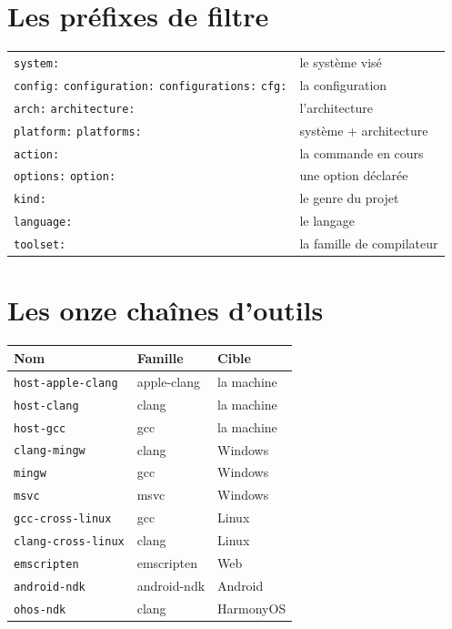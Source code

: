 \section{Les préfixes de filtre}

\begin{center}
\begin{tabular}{@{}ll@{}}
\toprule
\texttt{system:} & le système visé \\
\texttt{config:} \texttt{configuration:} \texttt{configurations:} \texttt{cfg:} & la configuration \\
\texttt{arch:} \texttt{architecture:} & l'architecture \\
\texttt{platform:} \texttt{platforms:} & système + architecture \\
\texttt{action:} & la commande en cours \\
\texttt{options:} \texttt{option:} & une option déclarée \\
\texttt{kind:} & le genre du projet \\
\texttt{language:} & le langage \\
\texttt{toolset:} & la famille de compilateur \\
\bottomrule
\end{tabular}
\end{center}

\section{Les onze chaînes d'outils}

\begin{center}
\begin{tabular}{@{}lll@{}}
\toprule
\textbf{Nom} & \textbf{Famille} & \textbf{Cible} \\
\midrule
\texttt{host-apple-clang} & apple-clang & la machine \\
\texttt{host-clang} & clang & la machine \\
\texttt{host-gcc} & gcc & la machine \\
\texttt{clang-mingw} & clang & Windows \\
\texttt{mingw} & gcc & Windows \\
\texttt{msvc} & msvc & Windows \\
\texttt{gcc-cross-linux} & gcc & Linux \\
\texttt{clang-cross-linux} & clang & Linux \\
\texttt{emscripten} & emscripten & Web \\
\texttt{android-ndk} & android-ndk & Android \\
\texttt{ohos-ndk} & clang & HarmonyOS \\
\bottomrule
\end{tabular}
\end{center}

